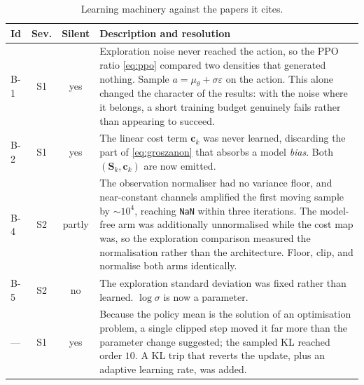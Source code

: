 \documentclass[11pt,a4paper,twoside,openright]{report}
\renewcommand{\vec}[1]{\bm{#1}}
\newcommand{\mat}[1]{\bm{#1}}
\theoremstyle{plain}
\theoremstyle{definition}
\theoremstyle{remark}
\begin{document}
	\begin{table}[htbp]
		\centering
		\caption{Learning machinery against the papers it cites.}
		\label{tab:audit-learning}
		\scriptsize
		\begin{tabularx}{\linewidth}{@{}l c c X@{}}
			\toprule
			\textbf{Id} & \textbf{Sev.} & \textbf{Silent} & \textbf{Description and resolution} \\
			\midrule
			B-1 & S1 & yes & Exploration noise never reached the action, so the PPO ratio \cref{eq:ppo} compared two densities that generated nothing. Sample $a=\mu_\theta+\sigma\varepsilon$ on the action. This alone changed the character of the results: with the noise where it belongs, a short training budget genuinely fails rather than appearing to succeed. \\
			B-2 & S1 & yes & The linear cost term $\vec c_k$ was never learned, discarding the part of \cref{eq:groszanon} that absorbs a model \emph{bias}. Both $(\mat S_k,\vec c_k)$ are now emitted. \\
			B-4 & S2 & partly & The observation normaliser had no variance floor, and near-constant channels amplified the first moving sample by $\sim10^4$, reaching \texttt{NaN} within three iterations. The model-free arm was additionally unnormalised while the cost map was, so the exploration comparison measured the normalisation rather than the architecture. Floor, clip, and normalise both arms identically. \\
			B-5 & S2 & no & The exploration standard deviation was fixed rather than learned. $\log\sigma$ is now a parameter. \\
			--- & S1 & yes & Because the policy mean is the solution of an optimisation problem, a single clipped step moved it far more than the parameter change suggested; the sampled KL reached order $10$. A KL trip that reverts the update, plus an adaptive learning rate, was added. \\
			\bottomrule
		\end{tabularx}
	\end{table}
\end{document}
